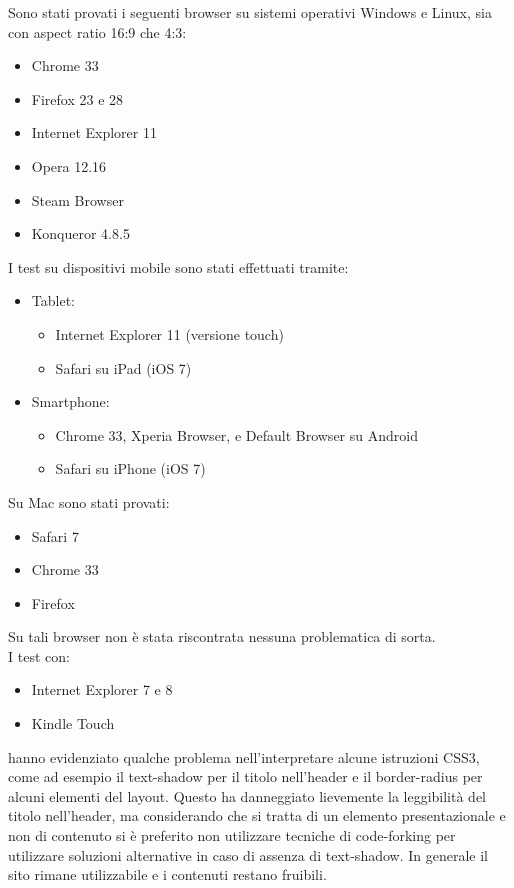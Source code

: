 \documentclass[10pt,a4paper,onecolumn]{article}
\begin{document}
Sono stati provati i seguenti browser su sistemi operativi Windows e Linux, sia con aspect ratio 16:9 che 4:3:
\begin{itemize}
 \item Chrome 33
 \item Firefox 23 e 28
 \item Internet Explorer 11
 \item Opera 12.16
 \item Steam Browser
 \item Konqueror 4.8.5
\end{itemize}
I test su dispositivi mobile sono stati effettuati tramite:
\begin{itemize}
 \item Tablet:
 \begin{itemize}
  \item Internet Explorer 11 (versione touch)
  \item Safari su iPad (iOS 7)
 \end{itemize}
 \item Smartphone:
 \begin{itemize}
  \item Chrome 33, Xperia Browser, e Default Browser su Android
  \item Safari su iPhone (iOS 7)
 \end{itemize}
\end{itemize}
Su Mac sono stati provati:
\begin{itemize}
 \item Safari 7
 \item Chrome 33
 \item Firefox 
\end{itemize}
Su tali browser non è stata riscontrata nessuna problematica di sorta. \\
I test con:
\begin{itemize}
 \item Internet Explorer 7 e 8
 \item Kindle Touch
\end{itemize}
hanno evidenziato qualche problema nell’interpretare alcune istruzioni CSS3, come ad esempio il text-shadow per il titolo nell’header e il border-radius per alcuni elementi del layout.
Questo ha danneggiato lievemente la leggibilità del titolo nell’header, ma considerando che si tratta di un elemento presentazionale e non di contenuto si è preferito non utilizzare tecniche di code-forking per utilizzare soluzioni alternative in caso di assenza di text-shadow.
In generale il sito rimane utilizzabile e i contenuti restano fruibili.
\end{document}
